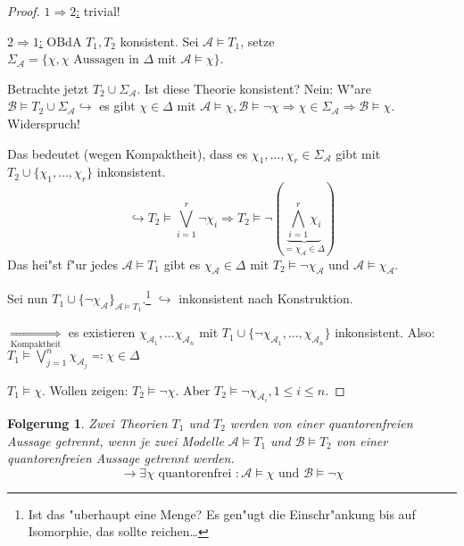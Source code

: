 \documentclass[a4paper,12pt,numbers=noenddot,parskip=full]{scrartcl}
\newcommand{\scrA}{\mathcal{A}}
\newcommand{\scrB}{\mathcal{B}}
\theoremstyle{dotless}
\newtheorem{corollary}[theorem]{Folgerung}
\theoremstyle{remark}
\begin{document}
\begin{proof}
	\underline{$1\Rightarrow2$:} trivial!
	
	\underline{$2 \Rightarrow 1$:} OBdA $T_1, T_2$ konsistent. Sei $\scrA \models T_1$, setze ${\Sigma_\scrA =\{\chi, \chi \text{ Aussagen in } \Delta\text{ mit } \scrA \models \chi \}}$. 
	
	Betrachte jetzt $T_2 \cup \Sigma_\scrA$. Ist diese Theorie konsistent? Nein: W"are $\scrB \models T_2 \cup \Sigma_\scrA \hookrightarrow$ es gibt $\chi \in \Delta$ mit $\scrA \models \chi, \scrB \models \lnot \chi \Rightarrow \chi \in \Sigma_\scrA \Rightarrow \scrB \models \chi$. Widerspruch!
	
	Das bedeutet (wegen Kompaktheit), dass es $\chi_1, \dots, \chi_r \in \Sigma_\scrA$ gibt mit $T_2 \cup \{\chi_1, \dots, \chi_r\}$ inkonsistent.
	\begin{equation*}
		\hookrightarrow T_2 \models \bigvee\limits_{i=1}^{r} \lnot \chi_i \Rightarrow T_2 \models \lnot (\underbrace{\bigwedge\limits_{i=1}^{r} \chi_i}_{=\chi_\scrA \in \Delta })
	\end{equation*}
	Das hei"st f"ur jedes $\scrA \models T_1$ gibt es $\chi_\scrA \in \Delta$ mit $T_2 \models \lnot \chi_\scrA$ und $\scrA \models \chi_\scrA$.
	
	Sei nun $T_1 \cup \{\lnot \chi_\scrA \}_{\scrA \models T_1}$.\footnote{Ist das "uberhaupt eine Menge? Es gen"ugt die Einschr"ankung bis auf Isomorphie, das sollte reichen\dots} $\hookrightarrow$ inkonsistent nach Konstruktion.
	
	$\underset{\text{Kompaktheit}}{\Rightarrow}$ es existieren $\chi_{\scrA_1}, \dots \chi_{\scrA_n}$ mit $T_1 \cup \{\lnot \chi_{\scrA_1}, \dots, \chi_{\scrA_n} \}$ inkonsistent. Also:\\ 
	$T_1 \models \bigvee\limits_{j=1}^n \chi_{\scrA_j} \eqqcolon \chi \in \Delta$
	
	$T_1 \models \chi$. Wollen zeigen: $T_2 \models \lnot \chi$. Aber $T_2 \models \lnot \chi_{\scrA_i}, 1 \leq i \leq n$.
\end{proof}

\begin{corollary}
	Zwei Theorien $T_1$ und $T_2$ werden von einer quantorenfreien Aussage getrennt, wenn je zwei Modelle $\scrA \models T_1$ und $\scrB \models T_2$ von einer quantorenfreien Aussage getrennt werden.
	\begin{equation*}
		\rightarrow \exists\chi \text{ quantorenfrei }: \scrA \models \chi \text{ und } \scrB \models \lnot \chi
	\end{equation*}
\end{corollary}
\end{document}
